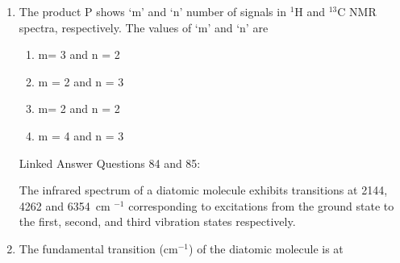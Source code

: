 \documentclass[12pt]{article}
\begin{document}
\begin{enumerate}
     \hfill{}


\item The product P shows ‘m’ and ‘n’ number of signals in $^1$H and $^{13}$C NMR spectra, respectively. The values of ‘m’ and ‘n’ are
\begin{enumerate}
\item m= 3 and n = 2
\item m = 2 and n = 3
\item m= 2 and n = 2
\item m = 4 and n = 3
   \hfill{}
   \end{enumerate}

    

Linked Answer Questions 84 and 85:

The infrared spectrum of a diatomic molecule exhibits transitions at 2144, 4262 and 6354~cm $^{-1}$ 
corresponding to excitations from the ground state to the first, second, and third vibration states respectively.

\item  The fundamental transition (cm$^{-1}$) of the diatomic molecule is at
\begin{enumerate}
   \hfill{}
\end{enumerate}


\end{enumerate}
\end{document}
